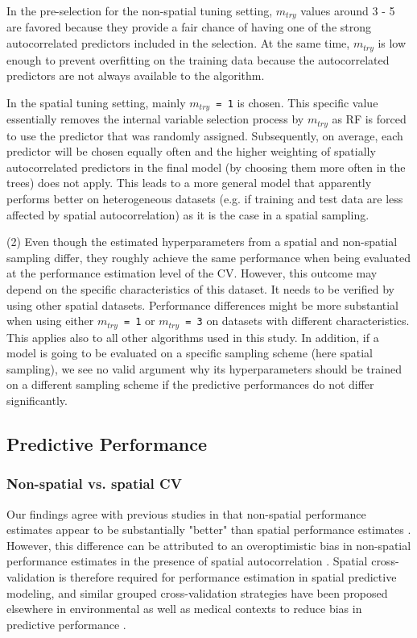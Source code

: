 \documentclass[review]{elsarticle}
\begin{document}
In the pre-selection for the non-spatial tuning setting, \texttt{$m_{try}$} values around 3 - 5 are favored because they provide a fair chance of having one of the strong autocorrelated predictors included in the selection.
At the same time, \texttt{$m_{try}$} is low enough to prevent overfitting on the training data because the autocorrelated predictors are not always available to the algorithm.

In the spatial tuning setting, mainly \texttt{$m_{try}$ = 1} is chosen.
This specific value essentially removes the internal variable selection process by \texttt{$m_{try}$} as RF is forced to use the predictor that was randomly assigned.
Subsequently, on average, each predictor will be chosen equally often and the higher weighting of spatially autocorrelated predictors in the final model (by choosing them more often in the trees) does not apply.
This leads to a more general model that apparently performs better on heterogeneous datasets (e.g. if training and test data are less affected by spatial autocorrelation) as it is the case in a spatial sampling.

(2) Even though the estimated hyperparameters from a spatial and non-spatial sampling differ, they roughly achieve the same performance when being evaluated at the performance estimation level of the CV.
However, this outcome may depend on the specific characteristics of this dataset.
It needs to be verified by using other spatial datasets.
Performance differences might be more substantial when using either \texttt{$m_{try}$ = 1} or \texttt{$m_{try}$ = 3} on datasets with different characteristics.
This applies also to all other algorithms used in this study.
In addition, if a model is going to be evaluated on a specific sampling scheme (here spatial sampling), we see no valid argument why its hyperparameters should be trained on a different sampling scheme if the predictive performances do not differ significantly.

\subsection{Predictive Performance}

\subsubsection{Non-spatial vs. spatial CV}
Our findings agree with previous studies in that non-spatial performance estimates appear to be substantially "better" than spatial performance estimates \citep{Meyer2018, MichelFetti2013, Roberts2017}.
However, this difference can be attributed to an overoptimistic bias in non-spatial performance estimates in the presence of spatial autocorrelation \citep{Goetz2015, Meyer2018, Russ2010a, Steger2016}.
Spatial cross-validation is therefore required for performance estimation in spatial predictive modeling, and similar grouped cross-validation strategies have been proposed elsewhere in environmental as well as medical contexts to reduce bias in predictive performance \citep{Brenning2008, Meyer2018, Pena2015, Pohjankukka2017, Roberts2017}.
\end{document}
